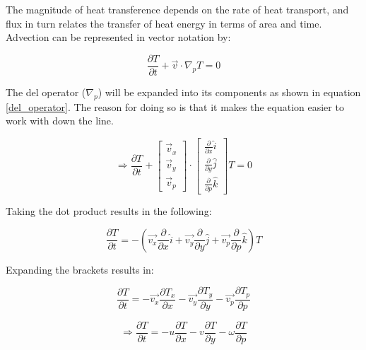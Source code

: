The magnitude of heat transference depends on the rate of heat transport, and flux in turn relates the transfer of heat energy in terms of area and time\cite{advection}. Advection can be represented in vector notation by:

\begin{equation}
    \frac{\partial T}{\partial t} + \Vec{v} \cdot \nabla_p T = 0
\end{equation}

The del operator ($\nabla_p$) will be expanded into its components as shown in equation \ref{del_operator}. The reason for doing so is that it makes the equation easier to work with down the line.

\begin{equation}
    \Rightarrow \frac{\partial T}{\partial t} + \begin{bmatrix} \Vec{v}_x \\ \Vec{v}_y \\ \Vec{v}_p \end{bmatrix} \cdot \begin{bmatrix} \frac{\partial}{\partial x} \hat{i} \\ \frac{\partial}{\partial y} \hat{j} \\ \frac{\partial}{\partial p} \hat{k} \end{bmatrix} T
    \label{del_operator} = 0
\end{equation}

Taking the dot product results in the following:

\begin{equation}
     \frac{\partial T}{\partial t} = - (\Vec{v_{x}} \frac{\partial}{\partial x} \hat{i} + \Vec{v_{y}} \frac{\partial}{\partial y} \hat{j} + \Vec{v_{p}} \frac{\partial}{\partial p} \hat{k}) T
\end{equation}

Expanding the brackets results in:

\begin{equation}
     \frac{\partial T}{\partial t} = -\Vec{v_{x}} \frac{\partial T_{x}}{\partial x} - \Vec{v_{y}} \frac{\partial T_{y}}{\partial y} - \Vec{v_{p}} \frac{\partial T_{p}}{\partial p} 
\end{equation}

\begin{equation}
    \Rightarrow \frac{\partial T}{\partial t} = -u \frac{\partial T}{\partial x} - v \frac{\partial T}{\partial y} - \omega \frac{\partial T}{\partial p}
\end{equation}

